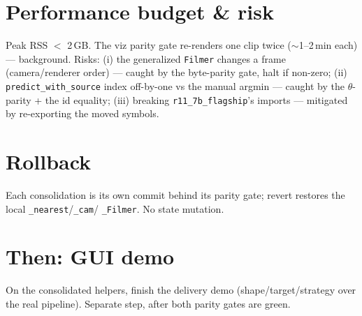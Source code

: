 \documentclass[11pt]{article}
\begin{document}
\section{Performance budget \& risk}
Peak RSS $<$ 2\,GB. The viz parity gate re-renders one clip twice ($\sim$1--2\,min each) --- background. Risks:
(i) the generalized \texttt{Filmer} changes a frame (camera/renderer order) --- caught by the byte-parity gate, halt if
non-zero; (ii) \texttt{predict\_with\_source} index off-by-one vs the manual argmin --- caught by the $\theta$-parity +
the id equality; (iii) breaking \texttt{r11\_7b\_flagship}'s imports --- mitigated by re-exporting the moved symbols.

\section{Rollback}
Each consolidation is its own commit behind its parity gate; revert restores the local \texttt{\_nearest}/\texttt{\_cam}/
\texttt{\_Filmer}. No state mutation.

\section{Then: GUI demo}
On the consolidated helpers, finish the delivery demo (shape/target/strategy over the real pipeline). Separate step,
after both parity gates are green.
\end{document}
